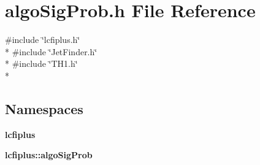 \section{algo\-Sig\-Prob.\-h File Reference}
\label{algoSigProb_8h}
{\ttfamily \#include \char`\"{}lcfiplus.\-h\char`\"{}}\\*
{\ttfamily \#include \char`\"{}Jet\-Finder.\-h\char`\"{}}\\*
{\ttfamily \#include \char`\"{}T\-H1.\-h\char`\"{}}\\*
\subsection*{Namespaces}
\begin{DoxyCompactItemize}
\item 
{\bf lcfiplus}
\item 
{\bf lcfiplus\-::algo\-Sig\-Prob}
\end{DoxyCompactItemize}
